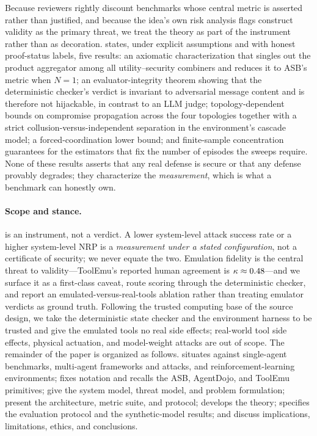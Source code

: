 Because reviewers rightly discount benchmarks whose central metric is asserted rather
than justified, and because the idea's own risk analysis flags construct validity as
the primary threat, we treat the theory as part of the instrument rather than as
decoration.  states, under explicit assumptions and with honest
proof-status labels, five results: an axiomatic characterization that singles out the
product aggregator among all utility--security combiners and reduces it to ASB's metric
when $N=1$; an evaluator-integrity theorem showing that the deterministic checker's
verdict is invariant to adversarial message content and is therefore not hijackable,
in contrast to an LLM judge; topology-dependent bounds on compromise propagation across
the four topologies together with a strict collusion-versus-independent separation in
the environment's cascade model; a forced-coordination lower bound; and finite-sample
concentration guarantees for the estimators that fix the number of episodes the sweeps
require. None of these results asserts that any real defense is secure or that any
defense provably degrades; they characterize the \emph{measurement}, which is what a
benchmark can honestly own.

\paragraph{Scope and stance.}
 is an instrument, not a verdict. A lower system-level attack success rate or
a higher system-level NRP is a \emph{measurement under a stated configuration}, not a
certificate of security; we never equate the two. Emulation fidelity is the central
threat to validity---ToolEmu's reported human agreement is $\kappa\approx 0.48$---and
we surface it as a first-class caveat, route scoring through the deterministic checker,
and report an emulated-versus-real-tools ablation rather than treating emulator verdicts
as ground truth. Following the trusted computing base of the source design, we take the
deterministic state checker and the environment harness to be trusted and give the
emulated tools no real side effects; real-world tool side effects, physical actuation,
and model-weight attacks are out of scope. The remainder of the paper is organized as
follows.  situates  against single-agent benchmarks,
multi-agent frameworks and attacks, and reinforcement-learning environments;
 fixes notation and recalls the ASB, AgentDojo, and ToolEmu
primitives;  give the system model, threat
model, and problem formulation;  present the
architecture, metric suite, and \corb{} protocol;  develops the
theory;  specifies the evaluation protocol and the synthetic-model
results; and  discuss
implications, limitations, ethics, and conclusions.
